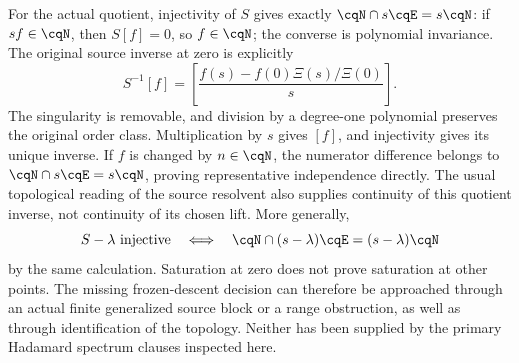 For the actual quotient, injectivity of $S$ gives exactly
$\cqN\cap s\cqE=s\cqN$: if $sf\in\cqN$, then
$S[f]=0$, so $f\in\cqN$; the converse is polynomial invariance.
The original source inverse at zero is explicitly
\begin{equation}
 S^{-1}[f]=\left[
 \frac{f(s)-f(0)\Xi(s)/\Xi(0)}{s}\right].
 \label{eq:cq-source-explicit-zero-resolvent}
\end{equation}
The singularity is removable, and division by a degree-one
polynomial preserves the original order class. Multiplication
by $s$ gives $[f]$, and injectivity gives its unique inverse.
If $f$ is changed by $n\in\cqN$, the numerator difference
belongs to $\cqN\cap s\cqE=s\cqN$, proving representative
independence directly. The usual topological reading of
the source resolvent also supplies continuity of this
quotient inverse, not continuity of its chosen lift.
More generally,
\[
 S-\lambda\text{ injective}\quad\Longleftrightarrow\quad
 \cqN\cap(s-\lambda)\cqE=(s-\lambda)\cqN
\]
by the same calculation. Saturation at zero does not prove
saturation at other points.
The missing frozen-descent decision can therefore be
approached through an actual finite generalized source block
or a range obstruction, as well as through identification
of the topology. Neither has been supplied by the primary
Hadamard spectrum clauses inspected here.
